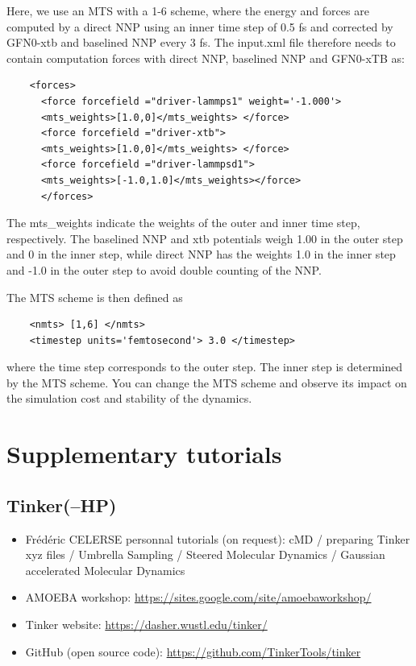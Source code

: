 \documentclass[12pt]{article}
\begin{document}
Here, we use an MTS with a 1-6 scheme, where the energy and forces are computed by a direct NNP using an inner time step of 0.5 fs and corrected by GFN0-xtb and baselined NNP every 3 fs. The input.xml file therefore needs to contain computation forces with direct NNP, baselined NNP and GFN0-xTB as:

\begin{verbatim}
    <forces>
      <force forcefield ="driver-lammps1" weight='-1.000'>
      <mts_weights>[1.0,0]</mts_weights> </force>
      <force forcefield ="driver-xtb">
      <mts_weights>[1.0,0]</mts_weights> </force>
      <force forcefield ="driver-lammpsd1">
      <mts_weights>[-1.0,1.0]</mts_weights></force>
      </forces>
\end{verbatim}

The mts\_weights indicate the weights of the outer and inner time step, respectively. The baselined NNP and xtb potentials weigh 1.00 in the outer step and 0 in the inner step, while direct NNP has the weights 1.0 in the inner step and -1.0 in the outer step to avoid double counting of the NNP.  

The  MTS scheme is then defined as
 \begin{verbatim}
    <nmts> [1,6] </nmts>
    <timestep units='femtosecond'> 3.0 </timestep>
 \end{verbatim}

where the time step corresponds to the outer step. The inner step is determined by the MTS scheme. You can change the MTS scheme and observe its impact on the simulation cost and stability of the dynamics.

%
\newpage
{}
\section{Supplementary tutorials}
\label{sec:tutorials}
\subsection{Tinker(--HP)}
\begin{itemize}
    \item Frédéric CELERSE personnal tutorials (on request): cMD / preparing Tinker xyz files / Umbrella Sampling / Steered Molecular Dynamics / Gaussian accelerated Molecular Dynamics
    \item AMOEBA workshop: \url{https://sites.google.com/site/amoebaworkshop/}
    \item Tinker website: \url{https://dasher.wustl.edu/tinker/}
    \item GitHub (open source code): \url{https://github.com/TinkerTools/tinker}
\end{itemize}
\end{document}
